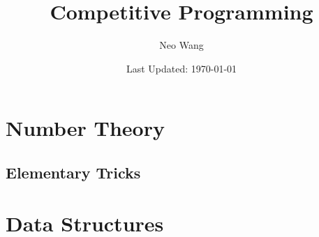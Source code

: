 \documentclass{scrreprt}
\title{Competitive Programming}
\author{Neo Wang}
\date{Last Updated: \today}
\begin{document}
\maketitle
\setcounter{tocdepth}{2}
\tableofcontents
\newpage

\chapter{Number Theory}
\section{Elementary Tricks}


\chapter{Data Structures}
\end{document}
